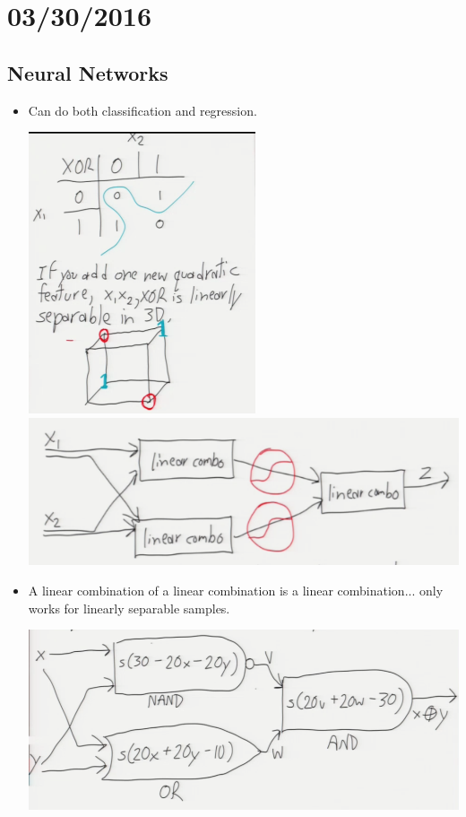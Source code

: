 \documentclass[10pt]{article}
\begin{document}
\section*{03/30/2016}
\subsection*{Neural Networks}
\begin{itemize}
	\item Can do both classification and regression.
	\begin{center}
		\includegraphics[scale=0.5]{../images/xorseparable}
		\includegraphics[scale=0.5]{../images/simplenet}
	\end{center}
	\item A linear combination of a linear combination is a linear combination... only works for linearly separable samples.
	\begin{center}
		\includegraphics[scale=0.5]{../images/xornet}
	\end{center}
\end{itemize}
\end{document}
